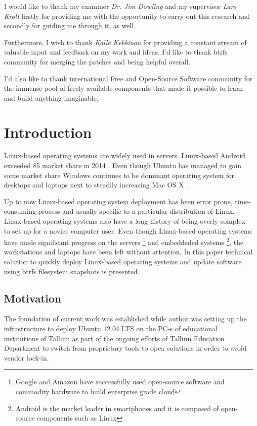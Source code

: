 \documentclass[a4paper,11pt]{kth-mag}
\begin{document}
I would like to thank my examiner \emph{Dr. Jim Dowling} and my supervisor \emph{Lars Kroll} firstly for providing me with the opportunity to carry out this research and secondly for guiding me through it, as well.

Furthermore, I wish to thank \emph{Kalle Kebbinau} for providing a constant
stream of valuable input and feedback on my work and ideas.
I'd like to thank \acrshort{btrfs} community for merging the patches and being helpful overall.

I'd also like to thank international Free and Open-Source Software community
for the immense pool of freely available components that made it possible
to learn and build anything imaginable.

\clearpage
\tableofcontents*
\mainmatter
\pagestyle{newchap}
\clearpage

%
%
%
%

\chapter{Introduction}
\label{chap:intro}

Linux-based operating systems are widely used in servers.
Linux-based Android exceeded 85%
market share in 2014
\cite{android-market-share}.
Even though Ubuntu has managed to gain some market share
Windows continues to be dominant operating system for desktops
and laptops next to steadily increasing Mac OS X
\cite{desktop-market-share}.

Up to now Linux-based operating system deployment has been
error prone, time-consuming process and usually specific to
a particular distribution of Linux.
Linux-based operating systems also have a long history
of being overly complex to set up for a novice computer user.
Even though Linux-based operating systems have made significant
progress on the servers
\footnote{Google and Amazon have successfully used open-source software
and commodity hardware to build enterprise grade cloud}
and embeddeded systems
\footnote{Android is the market leader in smartphones and it is composed of open-source components such as Linux},
the workstations and laptops have been left without attention.
In this paper technical solution to quickly
deploy Linux-based operating systems
and update software using
\acrshort{btrfs} filesystem snapshots is presented.

\section{Motivation}
\label{sec:mot}
The foundation of current work was established while author was setting up
the infrastructure to deploy Ubuntu 12.04 LTS on the PC-s of educational
institutions of Tallinn as part of the ongoing efforts of Tallinn Education
Department to switch from proprietary tools to open solutions
in order to avoid vendor lock-in.
\end{document}
